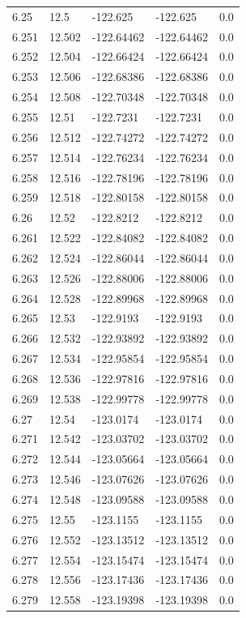\begin{tabular}{lllll}
6.25 & 12.5 & -122.625 & -122.625 & 0.0 \\
6.251 & 12.502 & -122.64462 & -122.64462 & 0.0 \\
6.252 & 12.504 & -122.66424 & -122.66424 & 0.0 \\
6.253 & 12.506 & -122.68386 & -122.68386 & 0.0 \\
6.254 & 12.508 & -122.70348 & -122.70348 & 0.0 \\
6.255 & 12.51 & -122.7231 & -122.7231 & 0.0 \\
6.256 & 12.512 & -122.74272 & -122.74272 & 0.0 \\
6.257 & 12.514 & -122.76234 & -122.76234 & 0.0 \\
6.258 & 12.516 & -122.78196 & -122.78196 & 0.0 \\
6.259 & 12.518 & -122.80158 & -122.80158 & 0.0 \\
6.26 & 12.52 & -122.8212 & -122.8212 & 0.0 \\
6.261 & 12.522 & -122.84082 & -122.84082 & 0.0 \\
6.262 & 12.524 & -122.86044 & -122.86044 & 0.0 \\
6.263 & 12.526 & -122.88006 & -122.88006 & 0.0 \\
6.264 & 12.528 & -122.89968 & -122.89968 & 0.0 \\
6.265 & 12.53 & -122.9193 & -122.9193 & 0.0 \\
6.266 & 12.532 & -122.93892 & -122.93892 & 0.0 \\
6.267 & 12.534 & -122.95854 & -122.95854 & 0.0 \\
6.268 & 12.536 & -122.97816 & -122.97816 & 0.0 \\
6.269 & 12.538 & -122.99778 & -122.99778 & 0.0 \\
6.27 & 12.54 & -123.0174 & -123.0174 & 0.0 \\
6.271 & 12.542 & -123.03702 & -123.03702 & 0.0 \\
6.272 & 12.544 & -123.05664 & -123.05664 & 0.0 \\
6.273 & 12.546 & -123.07626 & -123.07626 & 0.0 \\
6.274 & 12.548 & -123.09588 & -123.09588 & 0.0 \\
6.275 & 12.55 & -123.1155 & -123.1155 & 0.0 \\
6.276 & 12.552 & -123.13512 & -123.13512 & 0.0 \\
6.277 & 12.554 & -123.15474 & -123.15474 & 0.0 \\
6.278 & 12.556 & -123.17436 & -123.17436 & 0.0 \\
6.279 & 12.558 & -123.19398 & -123.19398 & 0.0 \\

\end{tabular}
